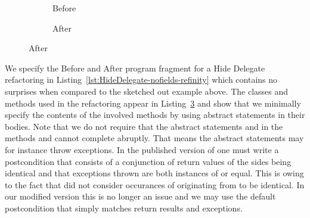 \begin{figure}
  \centering
  \begin{subfigure}[b]{.4\linewidth}
    
    \caption{Before}
    \label{lst:HideDelegate-nofields-resource-refinity}
  \end{subfigure}\hspace{1cm}
  \begin{subfigure}[b]{.4\linewidth}
    
    \caption{After}
    \label{lst:HideDelegate-nofields-owner-refinity}
  \end{subfigure}
\label{lst:HideDelegate-nofields-classes-refinity}
\end{figure}
We specify the Before and After program fragment for a Hide Delegate refactoring in Listing~\ref{lst:HideDelegate-nofields-refinity} which contains no surprises when compared to the sketched out example above.
The classes and methods used in the refactoring appear in Listing~\ref{lst:HideDelegate-nofields-classes-refinity} and show that we minimally specify the contents of the involved methods by using abstract
statements in their bodies.
Note that we do not require that the abstract statements  and  in the methods  and  cannot complete abruptly.
That means the abstract statements may for instance throw exceptions.
In the published version of \Refinity{} one must write a postcondition that consists of a conjunction of return values of the sides being identical and
that exceptions thrown are both instances of  or equal.
This is owing to the fact that \Refinity{} did not consider occurances of  originating from  to be identical.
In our modified version this is no longer an issue and we may use the default postcondition that simply matches return results and exceptions.









